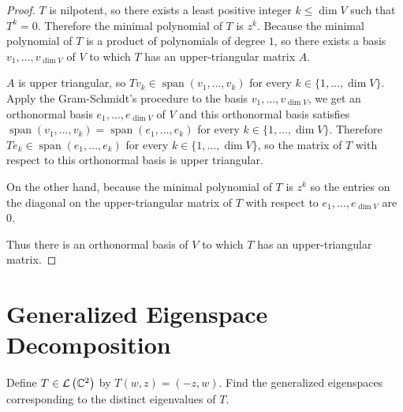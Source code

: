 \begin{proof}
    $T$ is nilpotent, so there exists a least positive integer $k\leq \dim V$ such that $T^{k} = 0$. Therefore the minimal polynomial of $T$ is $z^{k}$. Because the minimal polynomial of $T$ is a product of polynomials of degree $1$, so there exists a basis $v_{1}, \ldots, v_{\dim V}$ of $V$ to which $T$ has an upper-triangular matrix $A$.

    $A$ is upper triangular, so $Tv_{k}\in\operatorname{span}(v_{1}, \ldots, v_{k})$ for every $k\in\{1,\ldots,\dim V\}$. Apply the Gram-Schmidt's procedure to the basis $v_{1}, \ldots, v_{\dim V}$, we get an orthonormal basis $e_{1}, \ldots, e_{\dim V}$ of $V$ and this orthonormal basis satisfies $\operatorname{span}(v_{1}, \ldots, v_{k}) = \operatorname{span}(e_{1}, \ldots, e_{k})$ for every $k\in\{1,\ldots,\dim V\}$. Therefore $Te_{k}\in \operatorname{span}(e_{1}, \ldots, e_{k})$ for every $k\in\{1,\ldots,\dim V\}$, so the matrix of $T$ with respect to this orthonormal basis is upper triangular.

    On the other hand, because the minimal polynomial of $T$ is $z^{k}$ so the entries on the diagonal on the upper-triangular matrix of $T$ with respect to $e_{1}, \ldots, e_{\dim V}$ are $0$.

    Thus there is an orthonormal basis of $V$ to which $T$ has an upper-triangular matrix.
\end{proof}
\newpage

\section{Generalized Eigenspace Decomposition}

\begin{exercise}\label{chapter8:sectionB:exercise1}
    Define $T\in\mathcal{L}\left({\mathbb{C}^{2}}\right)$ by $T(w, z) = (-z, w)$. Find the generalized eigenspaces corresponding to the distinct eigenvalues of $T$.
\end{exercise}

